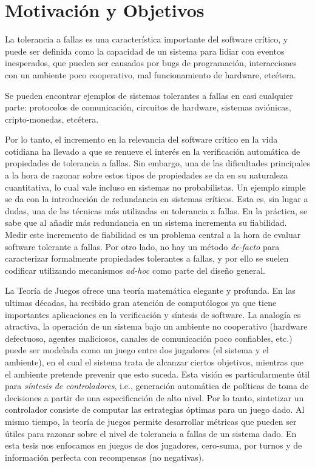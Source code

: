 \section{Motivaci\'on y Objetivos}
\label{sec:intro.objetivos}

La tolerancia a fallas es una característica importante del software crítico, y puede ser definida como la capacidad de un sistema para lidiar con eventos inesperados, que pueden ser causados por bugs de programación, interacciones con un ambiente poco cooperativo, mal funcionamiento de hardware, etcétera.

Se pueden encontrar ejemplos de sistemas tolerantes a fallas en casi cualquier parte: protocolos de comunicación, circuitos de hardware, sistemas aviónicas, cripto-monedas, etcétera.

Por lo tanto, el incremento en la relevancia del software crítico en la vida cotidiana ha llevado a que se renueve el interés en la verificación automática de propiedades de tolerancia a fallas. Sin embargo, una de las dificultades principales a la hora de razonar sobre estos tipos de propiedades se da en su naturaleza cuantitativa, lo cual vale incluso en sistemas no probabilistas.
Un ejemplo simple se da con la introducción de redundancia en sistemas críticos. Esta es, sin lugar a dudas, una de las técnicas más utilizadas en tolerancia a fallas.
En la práctica, se sabe que al añadir más redundancia en un sistema incrementa su fiabilidad. Medir este incremento de fiabilidad es un problema central a la hora de evaluar software tolerante a fallas. Por otro lado, no hay un método \emph{de-facto} para caracterizar formalmente propiedades tolerantes a fallas, y por ello se suelen codificar utilizando mecanismos \emph{ad-hoc} como parte del diseño general.

La Teoría de Juegos \cite{MorgensternNeuman42} ofrece una teoría matemática elegante y profunda. 
En las ultimas décadas, ha recibido gran atención de computólogos ya que tiene importantes aplicaciones en la verificación y síntesis de software. 
La analogía es atractiva, la operación de un sistema bajo un ambiente no cooperativo (hardware defectuoso, agentes maliciosos, canales de comunicación poco confiables, etc.) puede ser modelada como un juego entre dos jugadores (el sistema y el ambiente), en el cual el sistema trata de alcanzar ciertos objetivos, mientras que el ambiente pretende prevenir que esto suceda. 
Esta visión es particularmente útil para \emph{síntesis de controladores}, i.e., generación automática de políticas de toma de decisiones a partir de una especificación de alto nivel. 
Por lo tanto, sintetizar un controlador consiste de computar las estrategias óptimas para un juego dado. Al mismo tiempo, la teoría de juegos permite desarrollar métricas que pueden ser útiles para razonar sobre el nivel de tolerancia a fallas de un sistema dado.
En esta tesis nos enfocamos en juegos de dos jugadores, cero-suma, por turnos y de información perfecta con recompensas (no negativas)\cite{FilarV96}. 

